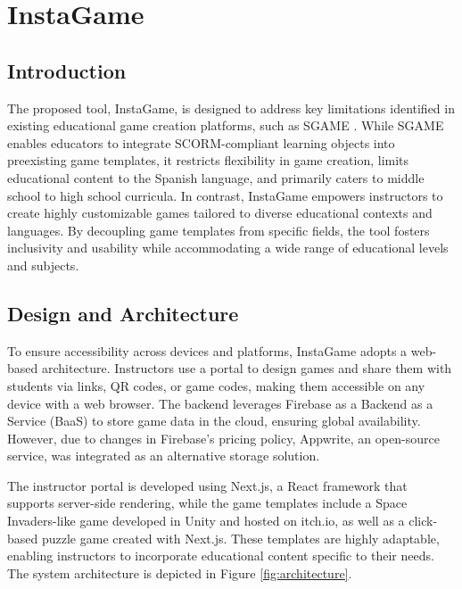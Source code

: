 \chapter{InstaGame}\label{chap:method}

\section{Introduction}

The proposed tool, InstaGame, is designed to address key limitations identified in existing educational game creation platforms, such as SGAME \cite{sgame2020}. While SGAME enables educators to integrate SCORM-compliant learning objects into preexisting game templates, it restricts flexibility in game creation, limits educational content to the Spanish language, and primarily caters to middle school to high school curricula. In contrast, InstaGame empowers instructors to create highly customizable games tailored to diverse educational contexts and languages. By decoupling game templates from specific fields, the tool fosters inclusivity and usability while accommodating a wide range of educational levels and subjects.

\section{Design and Architecture}

To ensure accessibility across devices and platforms, InstaGame adopts a web-based architecture. Instructors use a portal to design games and share them with students via links, QR codes, or game codes, making them accessible on any device with a web browser. The backend leverages Firebase as a Backend as a Service (BaaS) to store game data in the cloud, ensuring global availability. However, due to changes in Firebase's pricing policy, Appwrite, an open-source service, was integrated as an alternative storage solution.

The instructor portal is developed using Next.js, a React framework that supports server-side rendering, while the game templates include a Space Invaders-like game developed in Unity and hosted on itch.io, as well as a click-based puzzle game created with Next.js. These templates are highly adaptable, enabling instructors to incorporate educational content specific to their needs. The system architecture is depicted in Figure \ref{fig:architecture}.

